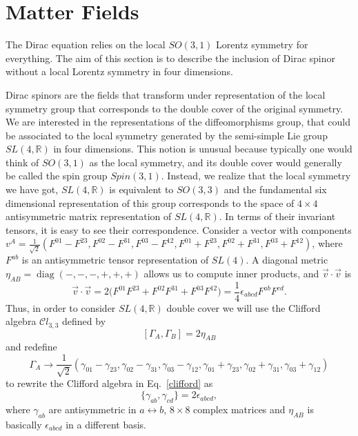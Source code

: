\documentclass{ws-mpla}
\newcommand{\comm}[2]{\left[#1,#2\right]}
\newcommand*{\diag}{\operatorname{diag}}
\renewcommand{\(}{\left(}
\renewcommand{\)}{\right)}
\renewcommand{\[}{\left[}
\renewcommand{\]}{\right]}
\begin{document}
\appendix

\section{\label{sec:matter} Matter Fields}

The Dirac equation relies on the local $SO(3,1)$ Lorentz symmetry for everything. The aim of this section is to describe the inclusion of Dirac spinor without a local Lorentz symmetry in four dimensions. 

Dirac spinors are the fields that transform under representation of the local symmetry group that corresponds to the double cover of the original symmetry. We are interested in the representations of the diffeomorphisms group, that could be associated to the local symmetry generated by the semi-simple Lie group $SL(4,\mathbb{R})$ in four dimensions. This notion is unusual because typically one would think of $SO(3,1)$ as the local symmetry, and its double cover would generally be called the spin group $Spin(3,1)$. Instead, we realize that the local symmetry we have got, $SL(4,{\mathbb R})$ is equivalent to $SO(3,3)$ and the fundamental six dimensional representation of this group corresponds to the space of $4\times 4$ antisymmetric matrix representation of $SL(4,{\mathbb R})$. In terms of their invariant tensors, it is easy to see their correspondence. Consider a vector with components 
$v^A=\frac{1}{\sqrt{2}}(F^{01}-F^{23},F^{02}-F^{31},F^{03}-F^{12},F^{01}+F^{23},F^{02}+F^{31},F^{03}+F^{12})$, where $F^{ab}$ is an antisymmetric tensor representation of $SL(4)$. 
A diagonal metric $\eta_{AB} = \diag(-,-,-,+,+,+)$ allows us to compute inner products, and $\vec{v}\cdot\vec{v}$ is 
\begin{dmath}
  \vec{v}\cdot\vec{v} = 2\bigg(F^{01}F^{23}+F^{02}F^{31}+F^{03}F^{12}\bigg)
  =\frac{1}{4}\epsilon_{abcd}F^{ab}F^{cd}.
\end{dmath}
Thus, in order to consider $SL(4,{\mathbb R})$ double cover we will use the Clifford algebra ${\mathcal Cl}_{3,3}$ defined by 
\begin{equation}
  \comm{\Gamma_A}{\Gamma_B} = 2 \eta_{AB}
  \label{clifford}
\end{equation}
and redefine
\begin{dmath}
  \Gamma_A\rightarrow\frac{1}{\sqrt{2}}(\gamma_{01}-\gamma_{23},\gamma_{02}-\gamma_{31},\gamma_{03}-\gamma_{12},\gamma_{01}
  +\gamma_{23},\gamma_{02}+\gamma_{31},\gamma_{03}+\gamma_{12})
\end{dmath} 
to rewrite the Clifford algebra in Eq.~\eqref{clifford} as 
\begin{equation}
  \label{Clifford} 
  \big\{\gamma_{ab},\gamma_{cd}\big\}=2\epsilon_{abcd},
\end{equation}
where $\gamma_{ab}$ are antisymmetric in $a\leftrightarrow b$, $8\times 8$  complex matrices and $\eta_{AB}$ is basically $\epsilon_{abcd} $ in a different basis.
\end{document}
